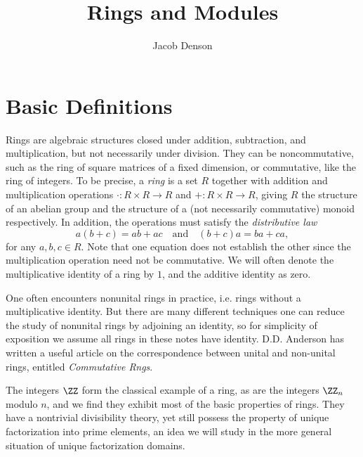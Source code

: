 

\title{Rings and Modules}
\author{Jacob Denson}



\maketitle
\tableofcontents

\chapter{Basic Definitions}


Rings are algebraic structures closed under addition, subtraction, and multiplication, but not necessarily under division. They can be noncommutative, such as the ring of square matrices of a fixed dimension, or commutative, like the ring of integers. To be precise, a \emph{ring} is a set $R$ together with addition and multiplication operations $\cdot: R \times R \to R$ and $+: R \times R \to R$, giving $R$ the structure of an abelian group and the structure of a (not necessarily commutative) monoid respectively. In addition, the operations must satisfy the \emph{distributive law}
%
\[ a(b + c) = ab + ac \quad\text{and}\quad (b + c)a = ba + ca, \]
%
for any $a,b,c \in R$. Note that one equation does not establish the other since the multiplication operation need not be commutative. We will often denote the multiplicative identity of a ring by $1$, and the additive identity as zero.

\begin{remark}
    One often encounters nonunital rings in practice, i.e. rings without a multiplicative identity. But there are many different techniques one can reduce the study of nonunital rings by adjoining an identity, so for simplicity of exposition we assume all rings in these notes have identity. D.D. Anderson has written a useful article on the correspondence between unital and non-unital rings, entitled \emph{Commutative Rngs}.
\end{remark}

\begin{example}
    The integers $\ZZ$ form the classical example of a ring, as are the integers $\ZZ_n$ modulo $n$, and we find they exhibit most of the basic properties of rings. They have a nontrivial divisibility theory, yet still possess the property of unique factorization into prime elements, an idea we will study in the more general situation of unique factorization domains.
\end{example}


